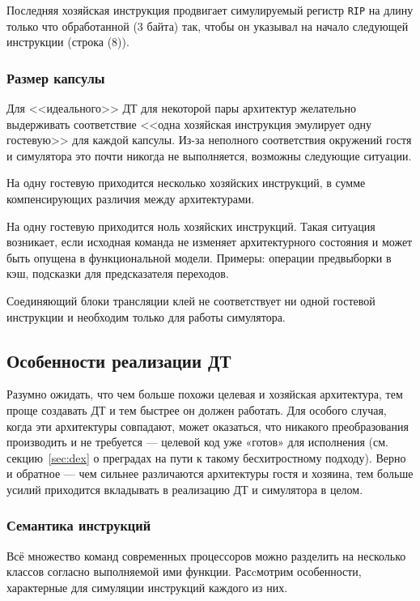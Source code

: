 Последняя хозяйская инструкция продвигает симулируемый регистр \texttt{RIP} на длину только что обработанной (3 байта) так, чтобы он указывал на начало следующей инструкции (строка (8)).

\subsubsection{Размер капсулы}
Для <<идеального>> ДТ для некоторой пары архитектур желательно выдерживать соответствие <<одна хозяйская инструкция эмулирует одну гостевую>> для каждой капсулы. Из-за неполного соответствия окружений гостя и симулятора это почти никогда не выполняется, возможны следующие ситуации.

\begin{enumerate*}
    \item На одну гостевую приходится несколько хозяйских инструкций, в сумме компенсирующих различия между архитектурами.
    \item На одну гостевую приходится ноль хозяйских инструкций. Такая ситуация возникает, если исходная команда не изменяет архитектурного состояния и может быть опущена в функциональной модели. Примеры: операции предвыборки в кэш, подсказки для предсказателя переходов.
    \item Соединяющий блоки трансляции клей не соответствует ни одной гостевой инструкции и необходим только для работы симулятора.
\end{enumerate*}


\subsection{Особенности реализации ДТ}

Разумно ожидать, что чем больше похожи целевая и хозяйская архитектура, тем проще создавать ДТ и тем быстрее он должен работать. Для особого случая, когда эти архитектуры совпадают, может оказаться, что никакого преобразования производить и не требуется --- целевой код уже «готов» для исполнения (см. секцию~\ref{sec:dex} о  преградах на пути к такому бесхитростному подходу). Верно и обратное --- чем сильнее различаются архитектуры гостя и хозяина, тем больше усилий приходится вкладывать в реализацию ДТ и симулятора в целом.

\subsubsection{Семантика инструкций}

Всё множество команд современных процессоров можно разделить на несколько классов согласно выполняемой ими функции. Расcмотрим особенности, характерные для симуляции инструкций каждого из них.

